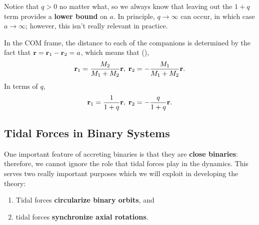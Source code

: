 \begin{remark}
    Notice that $q > 0$ no matter what, so we always know that leaving out the $1+q$ term provides a \textbf{lower bound} on $a$. In principle, $q \to \infty$ can occur, in which case $a \to \infty$; however, this isn't really relevant in practice.
\end{remark}

In the COM frame, the distance to each of the companions is determined by the fact that ${\bf r} = {\bf r}_1 - {\bf r}_2 = a$, which means that (),
\[
{\bf r}_1 = \frac{M_2}{M_1+M_2} {\bf r},\; {\bf r}_2 = - \frac{M_1}{M_1+M_2} {\bf r}.
\]
In terms of $q$, 
\[
{\bf r}_1 = \frac{1}{1+q} {\bf r},\; {\bf r}_2 = - \frac{q}{1+q} {\bf r}.
\]


\subsection{Tidal Forces in Binary Systems}

One important feature of accreting binaries is that they are \textbf{close binaries}: therefore, we cannot ignore the role that tidal forces play in the dynamics. This serves two really important purposes which we will exploit in developing the theory:

\begin{enumerate}
    \item Tidal forces \textbf{circularize binary orbits}, and
    \item tidal forces \textbf{synchronize axial rotations}.
\end{enumerate}

